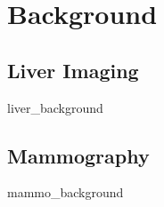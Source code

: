 \chapter{Background}


\section{Liver Imaging}
{liver_background}

\section{Mammography}
{mammo_background}




